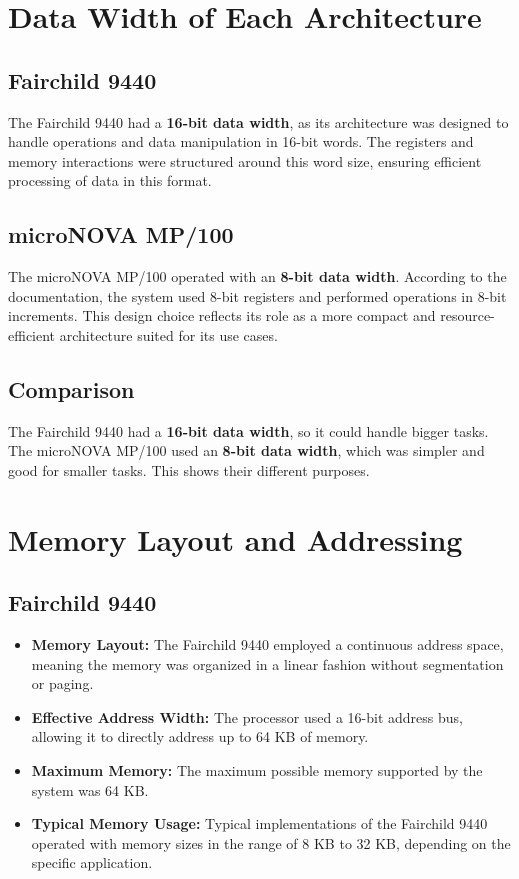 \documentclass[a4paper,12pt]{article}
\begin{document}
\section{Data Width of Each Architecture}

\subsection{Fairchild 9440}

The Fairchild 9440 had a \textbf{16-bit data width}, as its architecture was designed to handle operations and data manipulation in 16-bit words. The registers and memory interactions were structured around this word size, ensuring efficient processing of data in this format.

\subsection{microNOVA MP/100}

The microNOVA MP/100 operated with an \textbf{8-bit data width}. According to the documentation, the system used 8-bit registers and performed operations in 8-bit increments. This design choice reflects its role as a more compact and resource-efficient architecture suited for its use cases.
\subsection{Comparison}

The Fairchild 9440 had a \textbf{16-bit data width}, so it could handle bigger tasks.
\newline
The microNOVA MP/100 used an \textbf{8-bit data width}, which was simpler and good for smaller tasks. This shows their different purposes.


\section{Memory Layout and Addressing}

\subsection{Fairchild 9440}

\begin{itemize}
    \item \textbf{Memory Layout:} The Fairchild 9440 employed a continuous address space, meaning the memory was organized in a linear fashion without segmentation or paging.
    \item \textbf{Effective Address Width:} The processor used a 16-bit address bus, allowing it to directly address up to 64 KB of memory.
    \item \textbf{Maximum Memory:} The maximum possible memory supported by the system was 64 KB.
    \item \textbf{Typical Memory Usage:} Typical implementations of the Fairchild 9440 operated with memory sizes in the range of 8 KB to 32 KB, depending on the specific application.
\end{itemize}
\end{document}
